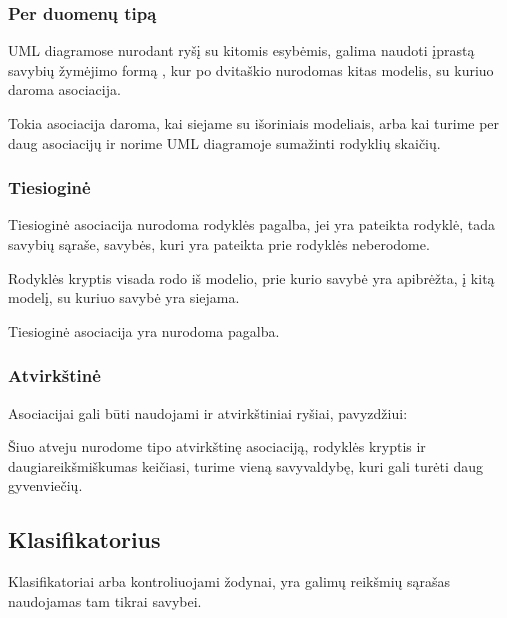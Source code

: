 \documentclass[letterpaper,10pt,lithuanian]{sphinxmanual}
\begin{document}
\subsubsection{Per duomenų tipą}
\label{\detokenize{modelis:per-duomenu-tipa}}
\sphinxAtStartPar
UML diagramose nurodant ryšį su kitomis esybėmis, galima naudoti įprastą
savybių žymėjimo formą , kur po \sphinxcode{\sphinxupquote{:}}
dvitaškio nurodomas kitas modelis, su kuriuo daroma asociacija.

\sphinxAtStartPar
Tokia asociacija daroma, kai siejame su išoriniais modeliais, arba kai turime
per daug asociacijų ir norime UML diagramoje sumažinti rodyklių skaičių.


\subsubsection{Tiesioginė}
\label{\detokenize{modelis:tiesiogine}}
\sphinxAtStartPar
Tiesioginė asociacija nurodoma rodyklės pagalba, jei yra pateikta rodyklė, tada
savybių sąraše, savybės, kuri yra pateikta prie rodyklės neberodome.

\sphinxAtStartPar
Rodyklės kryptis visada rodo iš modelio, prie kurio savybė yra apibrėžta, į
kitą modelį, su kuriuo savybė yra siejama.

\sphinxAtStartPar
Tiesioginė asociacija {\hyperref[\detokenize{savokos:term-DSA}]{}} yra nurodoma {\hyperref[\detokenize{tipai:type.ref}]{}} pagalba.


\subsubsection{Atvirkštinė}
\label{\detokenize{modelis:atvirkstine}}
\sphinxAtStartPar
Asociacijai gali būti naudojami ir atvirkštiniai ryšiai, pavyzdžiui:

\sphinxAtStartPar
Šiuo atveju nurodome {\hyperref[\detokenize{tipai:type.backref}]{}} tipo atvirkštinę asociaciją, rodyklės
kryptis ir daugiareikšmiškumas keičiasi, turime vieną savyvaldybę, kuri gali
turėti daug gyvenviečių.


\subsection{Klasifikatorius}
\label{\detokenize{modelis:klasifikatorius}}
\sphinxAtStartPar
Klasifikatoriai arba kontroliuojami žodynai, yra galimų reikšmių sąrašas
naudojamas tam tikrai savybei.
\end{document}
